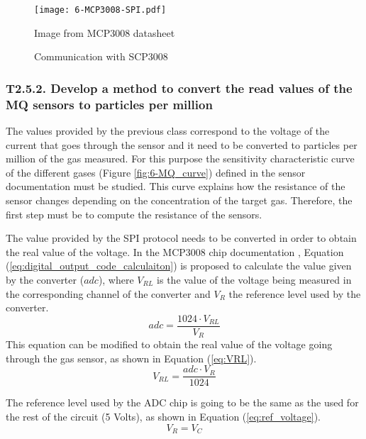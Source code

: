 \begin{figure}[!h]
	\begin{center}
		\texttt{[image: 6-MCP3008-SPI.pdf]}
		\caption{Communication with SCP3008}{Image from MCP3008 datasheet \cite{ADC}}
		\label{fig:6-MCP3008-SPI}
	\end{center}
\end{figure}




\subsubsection{T2.5.2. Develop a method to convert the read values of the MQ sensors to particles per million}
The values provided by the previous class correspond to the voltage of the current that goes through the sensor and it need to be converted to particles per million of the gas measured. For this purpose the sensitivity characteristic curve of the different gases (Figure \ref{fig:6-MQ_curve}) defined in the sensor documentation must be studied. This curve explains how the resistance of the sensor changes depending on the concentration of the target gas. Therefore, the first step must be to compute the resistance of the sensors. 

The value provided by the \ac{SPI} protocol needs to be converted in order to obtain the real value of the voltage. In the MCP3008 chip documentation \cite{ADC}, Equation (\ref{eq:digital_output_code_calculaiton}) is proposed to calculate the value given by the converter ($adc$), where ${V}_{RL}$ is the value of the voltage being measured in the corresponding channel of the converter and ${V}_{R}$ the reference level used by the converter.
\begin{equation} \label{eq:digital_output_code_calculaiton}
adc = \frac { 1024\cdot { V }_{ RL } }{ { V }_{ R } } 
\end{equation}
This equation can be modified to obtain the real value of the voltage going through the gas sensor, as shown in Equation (\ref{eq:VRL}).
\begin{equation} \label{eq:VRL}
{ V }_{ RL } =\frac { adc \cdot  { V }_{ R }}{ 1024 }  
\end{equation}

The reference level used by the \ac{ADC} chip is going to be the same as the used for the rest of the circuit (5 Volts), as shown in Equation (\ref{eq:ref_voltage}).
\begin{equation} \label{eq:ref_voltage}
{V}_{R} = {V}_{C}
\end{equation}

